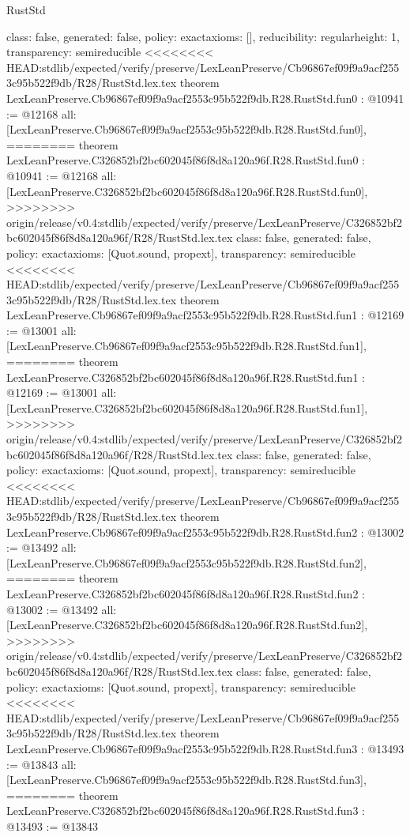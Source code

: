 \begin{lexlean}{RustStd}
\begin{coremodule}
{\begin{coremodule}
{{{  class: false,
  generated: false,
  policy: exact{axioms: []},
  reducibility: regular{height: 1},
  transparency: semireducible
}
<<<<<<<< HEAD:stdlib/expected/verify/preserve/LexLeanPreserve/Cb96867ef09f9a9acf2553c95b522f9db/R28/RustStd.lex.tex
theorem LexLeanPreserve.Cb96867ef09f9a9acf2553c95b522f9db.R28.RustStd.fun0 : @10941 := @12168 {
  all: [LexLeanPreserve.Cb96867ef09f9a9acf2553c95b522f9db.R28.RustStd.fun0],
========
theorem LexLeanPreserve.C326852bf2bc602045f86f8d8a120a96f.R28.RustStd.fun0 : @10941 := @12168 {
  all: [LexLeanPreserve.C326852bf2bc602045f86f8d8a120a96f.R28.RustStd.fun0],
>>>>>>>> origin/release/v0.4:stdlib/expected/verify/preserve/LexLeanPreserve/C326852bf2bc602045f86f8d8a120a96f/R28/RustStd.lex.tex
  class: false,
  generated: false,
  policy: exact{axioms: [Quot.sound, propext]},
  transparency: semireducible
}
<<<<<<<< HEAD:stdlib/expected/verify/preserve/LexLeanPreserve/Cb96867ef09f9a9acf2553c95b522f9db/R28/RustStd.lex.tex
theorem LexLeanPreserve.Cb96867ef09f9a9acf2553c95b522f9db.R28.RustStd.fun1 : @12169 := @13001 {
  all: [LexLeanPreserve.Cb96867ef09f9a9acf2553c95b522f9db.R28.RustStd.fun1],
========
theorem LexLeanPreserve.C326852bf2bc602045f86f8d8a120a96f.R28.RustStd.fun1 : @12169 := @13001 {
  all: [LexLeanPreserve.C326852bf2bc602045f86f8d8a120a96f.R28.RustStd.fun1],
>>>>>>>> origin/release/v0.4:stdlib/expected/verify/preserve/LexLeanPreserve/C326852bf2bc602045f86f8d8a120a96f/R28/RustStd.lex.tex
  class: false,
  generated: false,
  policy: exact{axioms: [Quot.sound, propext]},
  transparency: semireducible
}
<<<<<<<< HEAD:stdlib/expected/verify/preserve/LexLeanPreserve/Cb96867ef09f9a9acf2553c95b522f9db/R28/RustStd.lex.tex
theorem LexLeanPreserve.Cb96867ef09f9a9acf2553c95b522f9db.R28.RustStd.fun2 : @13002 := @13492 {
  all: [LexLeanPreserve.Cb96867ef09f9a9acf2553c95b522f9db.R28.RustStd.fun2],
========
theorem LexLeanPreserve.C326852bf2bc602045f86f8d8a120a96f.R28.RustStd.fun2 : @13002 := @13492 {
  all: [LexLeanPreserve.C326852bf2bc602045f86f8d8a120a96f.R28.RustStd.fun2],
>>>>>>>> origin/release/v0.4:stdlib/expected/verify/preserve/LexLeanPreserve/C326852bf2bc602045f86f8d8a120a96f/R28/RustStd.lex.tex
  class: false,
  generated: false,
  policy: exact{axioms: [Quot.sound, propext]},
  transparency: semireducible
}
<<<<<<<< HEAD:stdlib/expected/verify/preserve/LexLeanPreserve/Cb96867ef09f9a9acf2553c95b522f9db/R28/RustStd.lex.tex
theorem LexLeanPreserve.Cb96867ef09f9a9acf2553c95b522f9db.R28.RustStd.fun3 : @13493 := @13843 {
  all: [LexLeanPreserve.Cb96867ef09f9a9acf2553c95b522f9db.R28.RustStd.fun3],
========
theorem LexLeanPreserve.C326852bf2bc602045f86f8d8a120a96f.R28.RustStd.fun3 : @13493 := @13843 {
}}}}}}}
\end{coremodule}}
\end{coremodule}
\end{lexlean}
